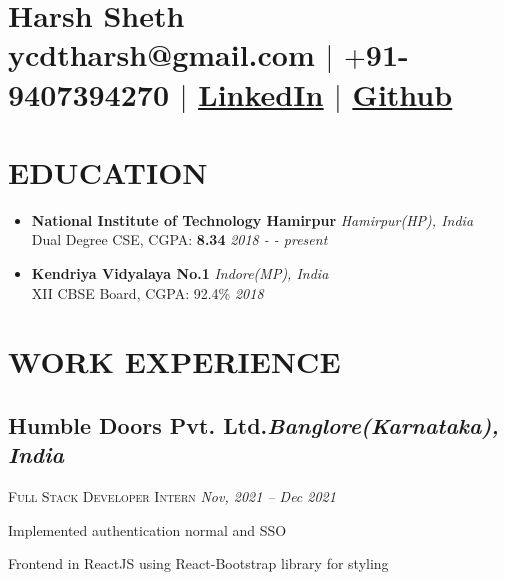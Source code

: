 \documentclass[11pt]{article}
\begin{document}
\section{\Huge{Harsh Sheth}\\ \large \normalfont ycdtharsh@gmail.com $|$ \normalfont $+$91-9407394270 $|$  \underline{\href{https://www.linkedin.com/in/harsh-sheth-2101}{LinkedIn}} $|$ \underline{\href{https://github.com/harsh-sheth}{Github}}}

\section{EDUCATION}
\begin{itemize}
  \item{
      \textbf{National Institute of Technology Hamirpur} \hfill \textit{Hamirpur(HP), India}\\
      Dual Degree CSE, CGPA: \textbf{8.34} \hfill \textit{2018 - - present}
  } 
  \item{
      \textbf{Kendriya Vidyalaya No.1} \hfill \textit{Indore(MP), India}\\
      XII CBSE Board, CGPA: 92.4\% \hfill \textit{2018}
  }
\end{itemize}


\section{WORK EXPERIENCE}
\subsection*{Humble Doors Pvt. Ltd.\hfill \normalsize \normalfont \textit{Banglore(Karnataka), India}}
\vspace{-1ex}
\textsc{\textmd{Full Stack Developer Intern}} \hfill \normalsize \textit{Nov, 2021 -- Dec 2021}
\vspace{-1ex}

\begin{description}
\setlength{\itemindent}{2\parindent}
\setlength{\itemsep}{0em}
\item[$\bullet$]{Implemented authentication normal and SSO}
\item[$\bullet$]{Frontend in ReactJS using React-Bootstrap library for styling}
\end{description}
\end{document}
